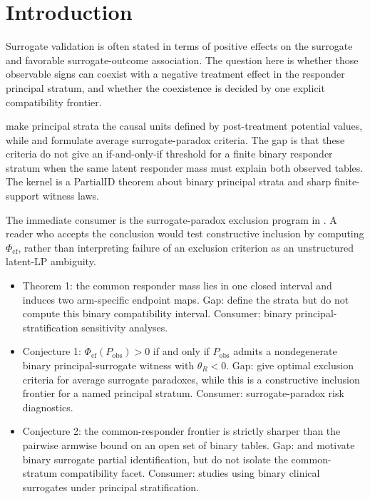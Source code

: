 \documentclass[11pt]{article}
\theoremstyle{definition}
\theoremstyle{plain}
\theoremstyle{remark}
\begin{document}
\section{Introduction}
Surrogate validation is often stated in terms of positive effects on the surrogate and favorable surrogate-outcome association. The question here is whether those observable signs can coexist with a negative treatment effect in the responder principal stratum, and whether the coexistence is decided by one explicit compatibility frontier.

\citet[Sec.~2]{FrangakisRubin2002} make principal strata the causal units defined by post-treatment potential values, while \citet[Sec.~3]{ChenGengJia2007} and \citet[Sec.~2]{YinLiuGengLuo2019} formulate average surrogate-paradox criteria. The gap is that these criteria do not give an if-and-only-if threshold for a finite binary responder stratum when the same latent responder mass must explain both observed tables. The kernel is a PartialID theorem about binary principal strata and sharp finite-support witness laws.

The immediate consumer is the surrogate-paradox exclusion program in \citet{YinLiuGengLuo2019}. A reader who accepts the conclusion would test constructive inclusion by computing \(\Phi_{\mathrm{cf}}\), rather than interpreting failure of an exclusion criterion as an unstructured latent-LP ambiguity.

\begin{itemize}[leftmargin=*]
  \item Theorem 1: the common responder mass lies in one closed interval and induces two arm-specific endpoint maps. Gap: \citet{FrangakisRubin2002} define the strata but do not compute this binary compatibility interval. Consumer: binary principal-stratification sensitivity analyses.
  \item Conjecture 1: \(\Phi_{\mathrm{cf}}(P_{\mathrm{obs}})>0\) if and only if \(P_{\mathrm{obs}}\) admits a nondegenerate binary principal-surrogate witness with \(\theta_R<0\). Gap: \citet{YinLiuGengLuo2019} give optimal exclusion criteria for average surrogate paradoxes, while this is a constructive inclusion frontier for a named principal stratum. Consumer: surrogate-paradox risk diagnostics.
  \item Conjecture 2: the common-responder frontier is strictly sharper than the pairwise armwise bound on an open set of binary tables. Gap: \citet{KurokiCai2013} and \citet{VanderWeele2013} motivate binary surrogate partial identification, but do not isolate the common-stratum compatibility facet. Consumer: studies using binary clinical surrogates under principal stratification.
\end{itemize}
\end{document}
